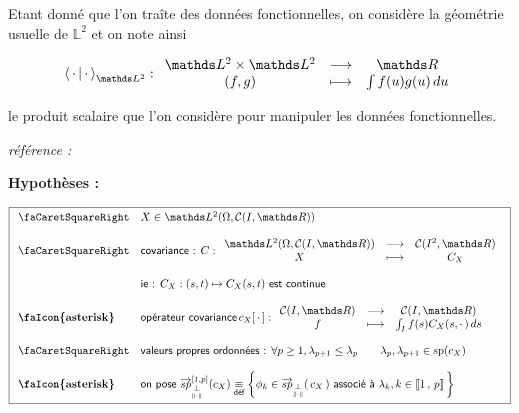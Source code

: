\bigskip

Etant donné que l'on traîte des données fonctionnelles, on considère la géométrie usuelle de $\mathds L^2$ et on note ainsi 

$$\prodscalselon \cdot \cdot {\mathds L^2}: \begin{array}{ccc}
    \mathds L^2 \times \mathds L^2 & \longrightarrow & \mathds R
    \\
    (f,g) & \longmapsto & \int f(u)g(u) \, du 
\end{array}$$ 

le produit scalaire que l'on considère pour manipuler les données fonctionnelles.

\begin{minipage}{\textwidth}
\begin{thm}
    \emph{référence :} ~\cite[pages : 238-239-241]{kokoszka2017introduction}

    \textbf{Hypothèses :}

    $$
    \boxed{
    \begin{array}{ll}
        \textsf{\faCaretSquareRight} & X \in \mathds L^2( \Omega, \mathcal C(I, \mathds R)) 
        \\ \\
        \textsf{\faCaretSquareRight} & \textsf{covariance : } C : \begin{array}{ccc}
            \mathds L^2( \Omega, \mathcal C(I, \mathds R)) & \longrightarrow & \mathcal C(I^2, \mathds R)
            \\
            X & \longmapsto & C_X
        \end{array}
        \\ \\
        & \textsf{ie : } C_X : (s, t) \mapsto C_X(s,t) \textsf{ est continue}
        \\ \\
        \textbf{\faIcon{asterisk}} & \textsf{opérateur covariance} \, c_X[ \, \cdot \, ] : \begin{array}{ccc}
            \mathcal C(I, \mathds R) & \longrightarrow & \mathcal C(I, \mathds R)
            \\
            f & \longmapsto & \int_I f(s) C_X(s, \cdot \, ) \, ds \end{array}
        \\\\
        \textsf{\faCaretSquareRight} & \textsf{valeurs propres ordonnées : } \forall p \geq 1, \lambda_{p+1} \leq \lambda_p \quad\quad \lambda_p, \lambda_{p+1} \in \operatorname{sp}(c_X)
        \\ \\
        \textbf{\faIcon{asterisk}} & \textsf{on pose } \overrightarrow{sp}_{\orthonormal}^{[1,p]}(c_X) \isdef \left\{ \phi_k \in \overrightarrow{sp}_{\orthonormal}( \, c_X \, ) \textsf{ associé à }  \lambda_k, k \in \intervaleint 1 p \, \right\}
    \end{array} 
    }
    $$


\end{thm}
\end{minipage}
